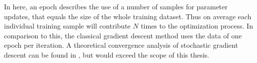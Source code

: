 \documentclass[11pt, a4paper]{article}
\newtheorem{algorithm}[theorem]{Algorithm}
\newcommand{\N}{\mathbb{N}}
\newcommand{\R}{\mathbb{R}}
\newcommand{\I}{\mathcal{I}}
\begin{document}
In here, an epoch describes the use of a number of samples for parameter updates, that equals the size of the whole training dataset. Thus on average each individual training sample will contribute $N$ times to the optimization process. In comparison to this, the classical gradient descent method uses the data of one epoch per iteration. A theoretical convergence analysis of stochastic gradient descent can be found in \cite{SGD}, but would exceed the scope of this thesis. \\



\end{document}

